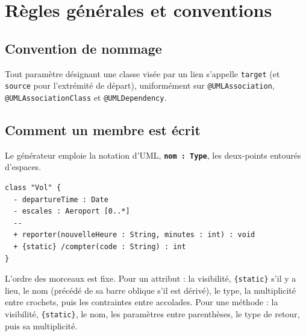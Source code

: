 \documentclass[12pt, a4paper]{article}
\begin{document}
\section{Règles générales et conventions}
\label{sec:regles}

\subsection{Convention de nommage}
Tout paramètre désignant une classe visée par un lien s'appelle \texttt{target} (et \texttt{source} pour l'extrémité de départ), uniformément sur \texttt{@UMLAssociation}, \texttt{@UMLAssociationClass} et \texttt{@UMLDependency}.

\subsection{Comment un membre est écrit}
\label{sec:membres}

Le générateur emploie la notation d'UML, \textbf{\texttt{nom : Type}}, les deux-points entourés d'espaces.

\begin{lstlisting}
class "Vol" {
  - departureTime : Date
  - escales : Aeroport [0..*]
  --
  + reporter(nouvelleHeure : String, minutes : int) : void
  + {static} /compter(code : String) : int
}
\end{lstlisting}

L'ordre des morceaux est fixe. Pour un attribut : la visibilité, \texttt{\{static\}} s'il y a lieu, le nom (précédé de sa barre oblique s'il est dérivé), le type, la multiplicité entre crochets, puis les contraintes entre accolades. Pour une méthode : la visibilité, \texttt{\{static\}}, le nom, les paramètres entre parenthèses, le type de retour, puis sa multiplicité.
\end{document}
